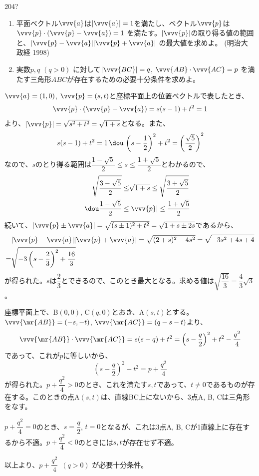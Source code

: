 \begin{prob}{204}{\hosi ?}{}
 \begin{enumerate}
  \item 平面ベクトル$\vvv{a}$は$|\vvv{a}|=1$を満たし、ベクトル$\vvv{p}$は$\vvv{p}\cdot(\vvv{p}-\vvv{a})=1$ を満たす。$|\vvv{p}|$の取り得る値の範囲と、$|\vvv{p}-\vvv{a}| |\vvv{p}+\vvv{a}|$ の最大値を求めよ。 (明治大 政経 1998)
  \item 実数$p, q$ $(q>0)$ に対して$|\vvv{BC}|=q$, $\vvv{AB}\cdot\vvv{AC}=p$ を満たす三角形$ABC$が存在するための必要十分条件を求めよ。
 \end{enumerate}
\end{prob}
$\vvv{a}=(1,0)$, $\vvv{p}=(s, t)$と座標平面上の位置ベクトルで表したとき、
\[ \vvv{p}\cdot(\vvv{p}-\vvv{a})=s(s-1)+t^2=1 \]
より、$|\vvv{p}|=\sqrt{s^2+t^2}=\sqrt{1+s}$となる。また、
\[ s(s-1)+t^2=1 \,\dou\, \left(s-\frac{1}{2}\right)^2+t^2=\left(\frac{\sqrt{5}}{2}\right)^2 \]
なので、$s$のとり得る範囲は$\dfrac{1-\sqrt{5}}{2}\le s\le \dfrac{1+\sqrt{5}}{2}$とわかるので、
\begin{align*}
 \sqrt{\frac{3-\sqrt{5}}{2}} \le &\sqrt{1+s} \le\sqrt{\frac{3+\sqrt{5}}{2}} \\
\qquad\dou \frac{1-\sqrt{5}}{2}\le &|\vvv{p}| \le \frac{1+\sqrt{5}}{2} 
\end{align*}
続いて、$|\vvv{p}\pm\vvv{a}|=\sqrt{(s\pm1)^2+t^2}=\sqrt{1+s\pm 2s}$であるから、
\begin{align*}
 &|\vvv{p}-\vvv{a}| |\vvv{p}+\vvv{a}| = \sqrt{(2+s)^2-4s^2} = \sqrt{-3s^2+4s+4} \\
 =& \sqrt{-3\left(s-\frac{2}{3}\right)^2+\frac{16}{3}}
\end{align*}
が得られた。$s$は$\dfrac{2}{3}$とできるので、このとき最大となる。求める値は$\sqrt{\dfrac{16}{3}}=\dfrac{4}{3}\sqrt{3}$。

座標平面上で、B$(0,0)$, C$(q,0)$とおき、A$(s, t)$とする。$\vvv{\mr{AB}}=(-s,-t)$, $\vvv{\mr{AC}}=(q-s -t)$より、
\[ \vvv{\mr{AB}}\cdot\vvv{\mr{AC}}=s(s-q)+t^2=\left(s-\frac{q}{2}\right)^2+t^2-\frac{q^2}{4} \]
であって、これが$p$に等しいから、
\[ \left(s-\frac{q}{2}\right)^2+t^2=p+\frac{q^2}{4} \]
が得られた。$p+\dfrac{q^2}{4}>0$のとき、これを満たす$s, t$であって、$t\neq 0$であるものが存在する。このときの点A$(s, t)$は、直線BC上にないから、3点A, B, Cは三角形をなす。

$p+\dfrac{q^2}{4}=0$のとき、$s=\dfrac{q}{2}$, $t=0$となるが、これは3点A, B, Cが1直線上に存在するから不適。$p+\dfrac{q^2}{4}<0$のときには$s, t$が存在せず不適。

以上より、$p+\dfrac{q^2}{4}$~$(q>0)$ が必要十分条件。